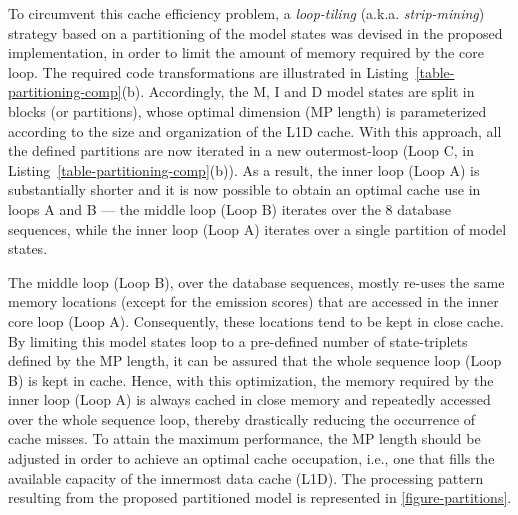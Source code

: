 \documentclass{bmcart}
\begin{document}
To circumvent this cache efficiency problem, a \emph{loop-tiling} (a.k.a. \emph{strip-mining}) strategy based on a partitioning of the model states was devised in the proposed implementation, in order to limit the amount of memory required by the core loop. The required code transformations are illustrated in Listing~\ref{table-partitioning-comp}(b). Accordingly, the M, I and D model states are split in blocks (or partitions), whose optimal dimension (\ac{MP} length) is parameterized according to the size and organization of the \ac{L1D} cache. With this approach, all the defined partitions are now iterated in a new outermost-loop (Loop C, in Listing~\ref{table-partitioning-comp}(b)). As a result, the inner loop (Loop A) is substantially shorter and it is now possible to obtain an optimal cache use in loops A and B --- the middle loop (Loop B) iterates over the 8 database sequences, while the inner loop (Loop A) iterates over a single partition of model states.  %

The middle loop (Loop B), over the database sequences, mostly re-uses the same memory locations (except for the emission scores) that are accessed in the inner core loop (Loop A). Consequently, these locations tend to be kept in close cache. By limiting this model states loop to a pre-defined number of state-triplets defined by the \ac{MP} length, it can be assured that the whole sequence loop (Loop B) is kept in cache. Hence, with this optimization, the memory required by the inner loop (Loop A) is always cached in close memory and repeatedly accessed over the whole sequence loop, thereby drastically reducing the occurrence of cache misses. To attain the maximum performance, the \ac{MP} length should be adjusted in order to achieve an optimal cache occupation, i.e., one that fills the available capacity of the innermost data cache (\ac{L1D}). The processing pattern resulting from the proposed partitioned model is represented in \autoref{figure-partitions}.
\end{document}
